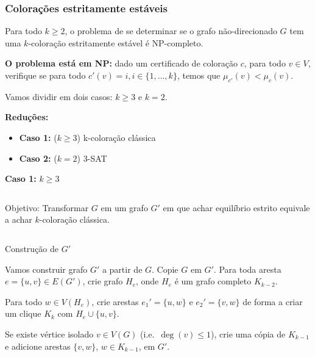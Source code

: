 \documentclass{beamer}
\theoremstyle{plain}
\begin{document}
\begin{frame}
  \frametitle{Colorações estritamente estáveis}
  \begin{theorem}
    Para todo $k\geq 2$, o problema de se determinar se o grafo não-direcionado $G$ tem uma
    $k$-coloração estritamente estável é NP-completo.
  \end{theorem}
\end{frame}

\begin{frame}
  \textbf{O problema está em NP\@:} dado um certificado de coloração $c$, para todo $v\in V$, verifique se
  para todo $c'(v)=i,i\in\{1,\ldots,k\}$, temos que $\mu_{c'}(v)<\mu_c(v)$.

  Vamos dividir em dois casos: $k\geq 3$ e $k=2$.

  \textbf{Reduções:}
  \begin{itemize}
    \item \textbf{Caso 1:} ($k\geq 3$) k-coloração clássica
    \item \textbf{Caso 2:} ($k=2$) 3-SAT
  \end{itemize}
\end{frame}

\begin{frame}
  \large\textbf{Caso 1:} $k\geq 3$

  \normalsize
  \begin{columns}[t]
    \begin{column}{0.9\textwidth}
      \begin{block}{Objetivo:}
        Transformar $G$ em um grafo $G'$ em que achar equilíbrio estrito equivale a achar
        $k$-coloração clássica.
      \end{block}
    \end{column}
  \end{columns}
  \vspace{0.2in}

  {\color{blue} Construção de $G'$}

  Vamos construir grafo $G'$ a partir de $G$. Copie $G$ em $G'$. Para toda aresta $e=\{u,v\}\in
  E(G')$, crie grafo $H_e$, onde $H_e$ é um grafo completo $K_{k-2}$.

  Para todo $w\in V(H_e)$, crie arestas $e_1'=\{u,w\}$ e $e_2'=\{v,w\}$ de forma a criar um clique
  $K_k$ com $H_e\cup\{u,v\}$.

  Se existe vértice isolado $v\in V(G)$ (i.e.\ $\deg(v)\leq 1$), crie uma cópia de $K_{k-1}$ e
  adicione arestas $\{v,w\}$, $w\in K_{k-1}$, em $G'$.
\end{frame}
\end{document}
